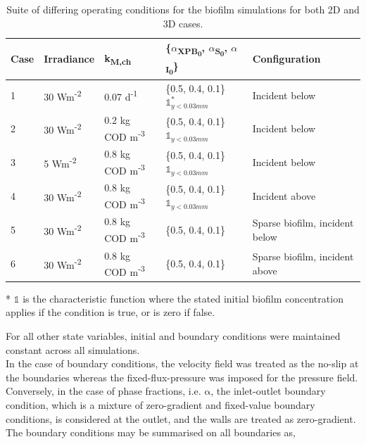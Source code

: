 \begin{table}[H]
    \centering
    \small
    \renewcommand{\arraystretch}{1.4}
    \caption{Suite of differing operating conditions for the biofilm simulations for both 2D and 3D cases.}
    \tabcolsep=0.11cm
    \begin{tabular}{@{}p{1cm} p{2cm} p{3cm} p{5cm} p{5cm}@{}} \toprule
Case & Irradiance  & k\textsubscript{M,ch}  & \{$\alpha$\textsubscript{XPB\textsubscript{0}}, $\alpha$\textsubscript{S\textsubscript{0}}, $\alpha$\textsubscript{I\textsubscript{0}}\}  &  Configuration \\ \hline
1    &  30 Wm\textsuperscript{-2}  &    0.07 d\textsuperscript{-1}    &  \{0.5, 0.4, 0.1\}$\mathds{1}^*_{y<0.03mm}$  & Incident below\\
2     &  30 Wm\textsuperscript{-2}  &    0.2 kg COD m\textsuperscript{-3}    &  \{0.5, 0.4, 0.1\}$\mathds{1}_{y<0.03mm}$ & Incident below\\
3    &  5 Wm\textsuperscript{-2}  &    0.8 kg COD m\textsuperscript{-3}    &  \{0.5, 0.4, 0.1\}$\mathds{1}_{y<0.03mm}$  & Incident below\\
4    &  30 Wm\textsuperscript{-2}  &    0.8 kg COD m\textsuperscript{-3}    &  \{0.5, 0.4, 0.1\}$\mathds{1}_{y<0.03mm}$  & Incident above\\
5    &  30 Wm\textsuperscript{-2}  &    0.8 kg COD m\textsuperscript{-3}    &  \{0.5, 0.4, 0.1\}  & Sparse biofilm, incident below\\
6    &  30 Wm\textsuperscript{-2}  &    0.8 kg COD m\textsuperscript{-3}    &  \{0.5, 0.4, 0.1\}  & Sparse biofilm, incident above\\ \hline
    \end{tabular}
  \scriptsize{
     * $\mathds{1}$ is the characteristic function where the stated initial biofilm concentration applies if the condition is true, or is zero if false.} 
    \label{tab:biofilm_cases}
\end{table}

For all other state variables, initial and boundary conditions were maintained constant across all simulations.\\

In the case of boundary conditions, the velocity field was treated as the no-slip at the boundaries whereas the fixed-flux-pressure was imposed for the pressure field. Conversely, in the case of phase fractions, i.e. $\mathrm{\alpha}$, the inlet-outlet boundary condition, which is a mixture of zero-gradient and fixed-value boundary conditions, is considered at the outlet, and the walls are treated as zero-gradient. The boundary conditions may be summarised on all boundaries as,  

